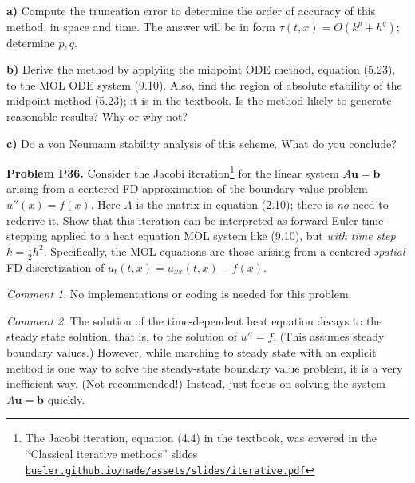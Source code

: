 \documentclass[12pt]{amsart}
\newcommand{\bb}{\mathbf{b}}
\newcommand{\bu}{\mathbf{u}}
\newcommand{\prob}[1]{\bigskip\noindent\textbf{#1}\quad }
\newcommand{\epart}[1]{\medskip\noindent\textbf{#1)}\quad }
\begin{document}
\epart{a} Compute the truncation error to determine the order of accuracy of this method, in space and time.  The answer will be in form $\tau(t,x) = O(k^p + h^q)$; determine $p,q$.

\epart{b} Derive the method by applying the midpoint ODE method, equation (5.23), to the MOL ODE system (9.10).   Also, find the region of absolute stability of the midpoint method (5.23); it is in the textbook.  Is the method likely to generate reasonable results?  Why or why not?

\epart{c} Do a von Neumann stability analysis of this scheme.  What do you conclude?


\prob{Problem P36.}  Consider the Jacobi iteration\footnote{The Jacobi iteration, equation (4.4) in the textbook, was covered in the ``Classical iterative methods'' slides \quad \href{https://bueler.github.io/nade/assets/slides/iterative.pdf}{\texttt{bueler.github.io/nade/assets/slides/iterative.pdf}}} for the linear system $A\bu=\bb$ arising from a centered FD approximation of the boundary value problem $u''(x) = f(x)$.  Here $A$ is the matrix in equation (2.10); there is \emph{no} need to rederive it.  Show that this iteration can be interpreted as forward Euler time-stepping applied to a heat equation MOL system like (9.10), but \emph{with time step} $k = \frac{1}{2} h^2$.  Specifically, the MOL equations are those arising from a centered \emph{spatial} FD discretization of $u_t(t,x) = u_{xx}(t,x) - f(x)$.

\medskip \noindent
\emph{Comment 1}.  No implementations or coding is needed for this problem.

\medskip \noindent
\emph{Comment 2}.  The solution of the time-dependent heat equation decays to the steady state solution, that is, to the solution of $u'' = f$.  (This assumes steady boundary values.)  However, while marching to steady state with an explicit method is one way to solve the steady-state boundary value problem, it is a very inefficient way.  (Not recommended!)  Instead, just focus on solving the system $A\bu=\bb$ quickly.
\end{document}
